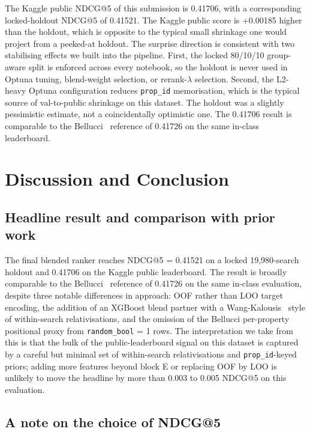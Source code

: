 \documentclass[runningheads]{llncs}
\begin{document}
The Kaggle public NDCG@5 of this submission is 0.41706, with a corresponding locked-holdout NDCG@5 of 0.41521. The Kaggle public score is +0.00185 higher than the holdout, which is opposite to the typical small shrinkage one would project from a peeked-at holdout. The surprise direction is consistent with two stabilising effects we built into the pipeline. First, the locked 80/10/10 group-aware split is enforced across every notebook, so the holdout is never used in Optuna tuning, blend-weight selection, or rerank-$\lambda$ selection. Second, the L2-heavy Optuna configuration reduces \texttt{prop\_id} memorisation, which is the typical source of val-to-public shrinkage on this dataset. The holdout was a slightly pessimistic estimate, not a coincidentally optimistic one. The 0.41706 result is comparable to the Bellucci~\cite{bellucci2021dmt} reference of 0.41726 on the same in-class leaderboard.

\section{Discussion and Conclusion}\label{sec:disc}

\subsection{Headline result and comparison with prior work}

The final blended ranker reaches NDCG@5 = 0.41521 on a locked 19{,}980-search holdout and 0.41706 on the Kaggle public leaderboard. The result is broadly comparable to the Bellucci~\cite{bellucci2021dmt} reference of 0.41726 on the same in-class evaluation, despite three notable differences in approach: OOF rather than LOO target encoding, the addition of an XGBoost blend partner with a Wang-Kalousis~\cite{wang2014expedia} style of within-search relativisations, and the omission of the Bellucci per-property positional proxy from \texttt{random\_bool} = 1 rows. The interpretation we take from this is that the bulk of the public-leaderboard signal on this dataset is captured by a careful but minimal set of within-search relativisations and \texttt{prop\_id}-keyed priors; adding more features beyond block E or replacing OOF by LOO is unlikely to move the headline by more than 0.003 to 0.005 NDCG@5 on this evaluation.

\subsection{A note on the choice of NDCG@5}
\end{document}
